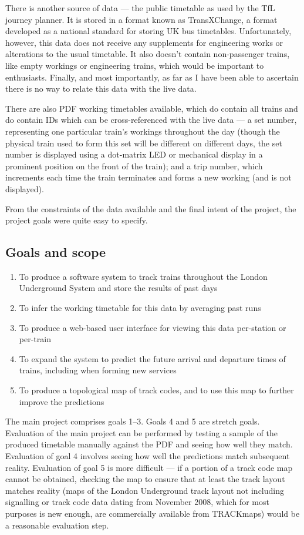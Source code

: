 \documentclass[a4paper,12pt]{article}
\begin{document}
There is another source of data --- the public timetable as used by the TfL
journey planner. It is stored in a format known as TransXChange, a format
developed as a national standard for storing UK bus
timetables\cite{TransXChangeSpec}. Unfortunately, however, this data does not
receive any supplements for engineering works or alterations to the usual
timetable. It also doesn't contain non-passenger trains, like empty workings or
engineering trains, which would be important to enthusiasts. Finally, and most
importantly, as far as I have been able to ascertain there is no way to relate
this data with the live data.

There are also PDF working timetables available\cite{TfLWTT}, which do contain
all trains and do contain IDs which can be cross-referenced with the live data
--- a set number, representing one particular train's workings throughout the
day (though the physical train used to form this set will be different on
different days, the set number is displayed using a dot-matrix LED or
mechanical display in a prominent position on the front of the train); and a
trip number, which increments each time the train terminates and forms a new
working (and is not displayed).

From the constraints of the data available and the final intent of the project,
the project goals were quite easy to specify.

\subsection{Goals and scope}

\begin{enumerate}
  \item To produce a software system to track trains throughout the London
    Underground System and store the results of past days
  \item To infer the working timetable for this data by averaging past runs
  \item To produce a web-based user interface for viewing this data per-station
    or per-train
  \item To expand the system to predict the future arrival and departure times
    of trains, including when forming new services
  \item To produce a topological map of track codes, and to use this map to
    further improve the predictions
\end{enumerate}

The main project comprises goals 1--3. Goals 4 and 5 are stretch goals.
Evaluation of the main project can be performed by testing a sample of the
produced timetable manually against the PDF and seeing how well they match.
Evaluation of goal 4 involves seeing how well the predictions match subsequent
reality. Evaluation of goal 5 is more difficult --- if a portion of a track
code map cannot be obtained, checking the map to ensure that at least the track
layout matches reality (maps of the London Underground track layout not
including signalling or track code data dating from November 2008, which for
most purposes is new enough, are commercially available from TRACKmaps) would
be a reasonable evaluation step.
\end{document}
